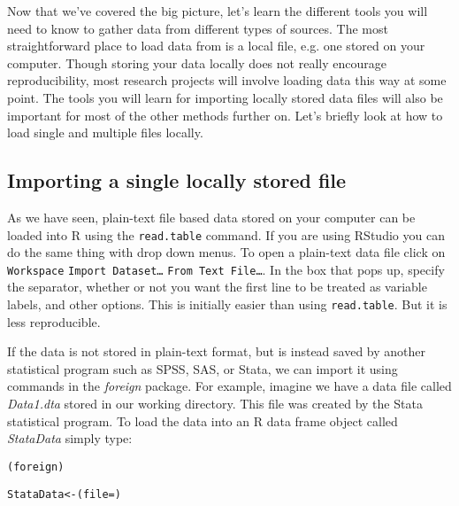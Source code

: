 Now that we've covered the big picture, let's learn the different tools you will need to know to gather data from different types of sources. The most straightforward place to load data from is a local file, e.g. one stored on your computer. Though storing your data locally does not really encourage reproducibility, most research projects will involve loading data this way at some point. The tools you will learn for importing locally stored data files will also be important for most of the other methods further on. Let's briefly look at how to load single and multiple files locally.

\subsection{Importing a single locally stored file}

As we have seen, plain-text file based data stored on your computer can be loaded into R using the \texttt{read.table} command. If you are using RStudio you can do the same thing with drop down menus. To open a plain-text data file click on \texttt{Workspace} \textrightarrow\: \texttt{Import Dataset\ldots} \textrightarrow\: \texttt{From Text File\ldots}. In the box that pops up, specify the separator, whether or not you want the first line to be treated as variable labels, and other options. This is initially easier than using \texttt{read.table}. But it is less reproducible.

If the data is not stored in plain-text format, but is instead saved by another statistical program such as SPSS, SAS, or Stata, we can import it using commands in the \emph{foreign} package. For example, imagine we have a data file called \emph{Data1.dta} stored in our working directory. This file was created by the Stata statistical program. To load the data into an R data frame object called \emph{StataData} simply type:

\begin{knitrout}
\color{fgcolor}\begin{kframe}
\begin{alltt}
(foreign)

StataData <- (file = )
\end{alltt}
\end{kframe}
\end{knitrout}


